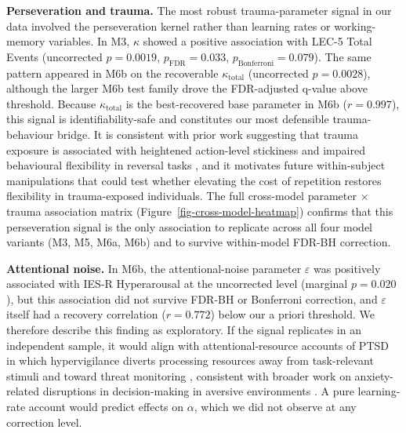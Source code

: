 \documentclass{article}
\begin{document}
\textbf{Perseveration and trauma.} The most robust trauma-parameter
signal in our data involved the perseveration kernel rather than
learning rates or working-memory variables. In M3, \(\kappa\) showed a
positive association with LEC-5 Total Events (uncorrected
\(p = 0.0019\), \(p_{\text{FDR}} = 0.033\),
\(p_{\text{Bonferroni}} = 0.079\)). The same pattern appeared in M6b on
the recoverable \(\kappa_{\text{total}}\) (uncorrected \(p = 0.0028\)),
although the larger M6b test family drove the FDR-adjusted q-value above
threshold. Because \(\kappa_{\text{total}}\) is the best-recovered base
parameter in M6b (\(r = 0.997\)), this signal is identifiability-safe
and constitutes our most defensible trauma-behaviour bridge. It is
consistent with prior work suggesting that trauma exposure is associated
with heightened action-level stickiness and impaired behavioural
flexibility in reversal tasks \citep{collins2014working}, and it
motivates future within-subject manipulations that could test whether
elevating the cost of repetition restores flexibility in trauma-exposed
individuals. The full cross-model parameter \(\times\) trauma
association matrix (Figure~\ref{fig-cross-model-heatmap}) confirms that
this perseveration signal is the only association to replicate across
all four model variants (M3, M5, M6a, M6b) and to survive within-model
FDR-BH correction.

\textbf{Attentional noise.} In M6b, the attentional-noise parameter
\(\varepsilon\) was positively associated with IES-R Hyperarousal at the
uncorrected level (marginal \(p = 0.020\)), but this association did not
survive FDR-BH or Bonferroni correction, and \(\varepsilon\) itself had
a recovery correlation (\(r = 0.772\)) below our a priori threshold. We
therefore describe this finding as exploratory. If the signal replicates
in an independent sample, it would align with attentional-resource
accounts of PTSD in which hypervigilance diverts processing resources
away from task-relevant stimuli and toward threat monitoring
\citep{lissek2005classical}, consistent with broader work on
anxiety-related disruptions in decision-making in aversive environments
\citep{browning2015anxious}. A pure learning-rate account
\citep{gillan2016characterizing, millner2018pavlovian} would predict
effects on \(\alpha\), which we did not observe at any correction level.
\end{document}
